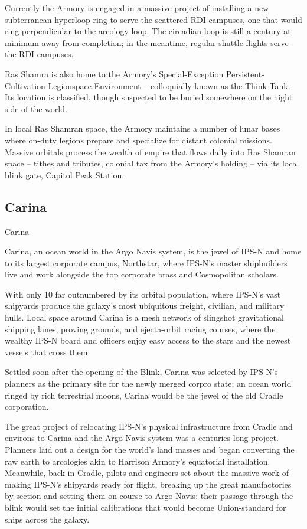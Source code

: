 Currently the Armory is engaged in a massive project of installing a new subterranean hyperloop  
ring to serve the scattered RDI campuses, one that would ring perpendicular to the arcology loop.  
The circadian loop is still a century at minimum away from completion; in the meantime, regular  
shuttle flights serve the RDI campuses.   

Ras Shamra is also home to the Armory’s Special-Exception Persistent-Cultivation Legionspace  
Environment -- colloquially known as the Think Tank. Its location is classified, though suspected to  
be buried somewhere on the night side of the world.   

In local Ras Shamran space, the Armory maintains a number of lunar bases where on-duty  
legions prepare and specialize for distant colonial missions. Massive orbitals process the wealth  
of empire that flows daily into Ras Shamran space -- tithes and tributes, colonial tax from the  
Armory’s holding -- via its local blink gate, Capitol Peak Station.    
\subsection{Carina}
Carina   

Carina, an ocean world in the Argo Navis system, is the jewel of IPS-N and home to its largest  
corporate campus, Northstar, where IPS-N’s master shipbuilders live and work alongside the top  
corporate brass and Cosmopolitan scholars.   

With only 10%
far outnumbered by its orbital population, where IPS-N’s vast shipyards produce the galaxy’s most  
ubiquitous freight, civilian, and military hulls. Local space around Carina is a mesh network of  
slingshot gravitational shipping lanes, proving grounds, and ejecta-orbit racing courses, where the  
wealthy IPS-N board and officers enjoy easy access to the stars and the newest vessels that  
cross them.    

Settled soon after the opening of the Blink, Carina was selected by IPS-N’s planners as the  
primary site for the newly merged corpro state; an ocean world ringed by rich terrestrial moons,  
Carina would be the jewel of the old Cradle corporation.   

The great project of relocating IPS-N’s physical infrastructure from Cradle and environs to Carina  
and the Argo Navis system was a centuries-long project. Planners laid out a design for the world’s  
land masses and began converting the raw earth to arcologies akin to Harrison Armory’s  
equatorial installation. Meanwhile, back in Cradle, pilots and engineers set about the massive  
work of making IPS-N’s shipyards ready for flight, breaking up the great manufactories by section  
and setting them on course to Argo Navis: their passage through the blink would set the initial  
calibrations that would become Union-standard for ships across the galaxy.   

